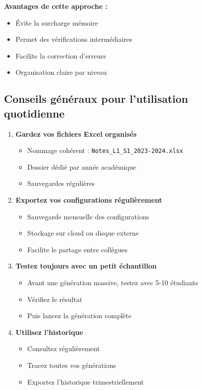 \textbf{Avantages de cette approche :}
\begin{itemize}[leftmargin=*]
    \item Évite la surcharge mémoire
    \item Permet des vérifications intermédiaires
    \item Facilite la correction d'erreurs
    \item Organisation claire par niveau
\end{itemize}

\subsection{Conseils généraux pour l'utilisation quotidienne}

\begin{enumerate}[leftmargin=*]
    \item \textbf{Gardez vos fichiers Excel organisés}
    \begin{itemize}
        \item Nommage cohérent : \texttt{Notes\_L1\_S1\_2023-2024.xlsx}
        \item Dossier dédié par année académique
        \item Sauvegardes régulières
    \end{itemize}

    \item \textbf{Exportez vos configurations régulièrement}
    \begin{itemize}
        \item Sauvegarde mensuelle des configurations
        \item Stockage sur cloud ou disque externe
        \item Facilite le partage entre collègues
    \end{itemize}

    \item \textbf{Testez toujours avec un petit échantillon}
    \begin{itemize}
        \item Avant une génération massive, testez avec 5-10 étudiants
        \item Vérifiez le résultat
        \item Puis lancez la génération complète
    \end{itemize}

    \item \textbf{Utilisez l'historique}
    \begin{itemize}
        \item Consultez régulièrement 
        \item Tracez toutes vos générations
        \item Exportez l'historique trimestriellement
    \end{itemize}


\end{enumerate}
